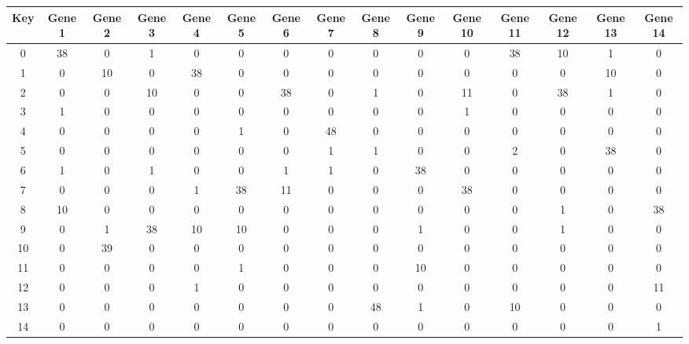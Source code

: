 \begin{tabular}{|c|c|c|c|c|c|c|c|c|c|c|c|c|c|c|}
\hline
Key & Gene 1 & Gene 2 & Gene 3 & Gene 4 & Gene 5 & Gene 6 & Gene 7 & Gene 8 & Gene 9 & Gene 10 & Gene 11 & Gene 12 & Gene 13 & Gene 14 \\
\hline
0 & 38 & 0 & 1 & 0 & 0 & 0 & 0 & 0 & 0 & 0 & 38 & 10 & 1 & 0 \\
1 & 0 & 10 & 0 & 38 & 0 & 0 & 0 & 0 & 0 & 0 & 0 & 0 & 10 & 0 \\
2 & 0 & 0 & 10 & 0 & 0 & 38 & 0 & 1 & 0 & 11 & 0 & 38 & 1 & 0 \\
3 & 1 & 0 & 0 & 0 & 0 & 0 & 0 & 0 & 0 & 1 & 0 & 0 & 0 & 0 \\
4 & 0 & 0 & 0 & 0 & 1 & 0 & 48 & 0 & 0 & 0 & 0 & 0 & 0 & 0 \\
5 & 0 & 0 & 0 & 0 & 0 & 0 & 1 & 1 & 0 & 0 & 2 & 0 & 38 & 0 \\
6 & 1 & 0 & 1 & 0 & 0 & 1 & 1 & 0 & 38 & 0 & 0 & 0 & 0 & 0 \\
7 & 0 & 0 & 0 & 1 & 38 & 11 & 0 & 0 & 0 & 38 & 0 & 0 & 0 & 0 \\
8 & 10 & 0 & 0 & 0 & 0 & 0 & 0 & 0 & 0 & 0 & 0 & 1 & 0 & 38 \\
9 & 0 & 1 & 38 & 10 & 10 & 0 & 0 & 0 & 1 & 0 & 0 & 1 & 0 & 0 \\
10 & 0 & 39 & 0 & 0 & 0 & 0 & 0 & 0 & 0 & 0 & 0 & 0 & 0 & 0 \\
11 & 0 & 0 & 0 & 0 & 1 & 0 & 0 & 0 & 10 & 0 & 0 & 0 & 0 & 0 \\
12 & 0 & 0 & 0 & 1 & 0 & 0 & 0 & 0 & 0 & 0 & 0 & 0 & 0 & 11 \\
13 & 0 & 0 & 0 & 0 & 0 & 0 & 0 & 48 & 1 & 0 & 10 & 0 & 0 & 0 \\
14 & 0 & 0 & 0 & 0 & 0 & 0 & 0 & 0 & 0 & 0 & 0 & 0 & 0 & 1 \\
\hline
\end{tabular}